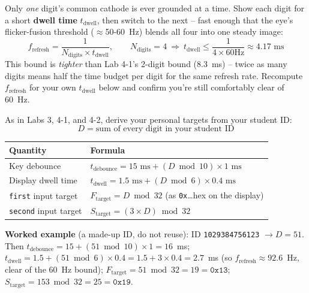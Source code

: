 \documentclass[11pt]{article}
\begin{document}
\begin{summary}
Only \emph{one} digit's common cathode is ever grounded at a time. Show each digit
for a short \textbf{dwell time} $t_{\text{dwell}}$, then switch to the next --
fast enough that the eye's flicker-fusion threshold ($\approx$50-60~Hz) blends all
four into one steady image:
\[
f_{\text{refresh}} = \frac{1}{N_{\text{digits}} \times t_{\text{dwell}}}, \qquad
N_{\text{digits}} = 4 \ \Rightarrow\ t_{\text{dwell}} \le \frac{1}{4 \times 60\text{Hz}}
\approx 4.17\text{ ms}
\]
This bound is \emph{tighter} than Lab 4-1's 2-digit bound (8.3~ms) -- twice as many
digits means half the time budget per digit for the same refresh rate. Recompute
$f_{\text{refresh}}$ for your own $t_{\text{dwell}}$ below and confirm you're still
comfortably clear of 60~Hz.
\end{summary}

\begin{summary}
As in Labs 3, 4-1, and 4-2, derive your personal targets from your student ID:
\[
D = \text{sum of every digit in your student ID}
\]
\begin{center}
\begin{tabular}{@{}p{4.6cm}p{10.0cm}@{}}
\toprule
\textbf{Quantity} & \textbf{Formula} \\
\midrule
Key debounce & $t_{\text{debounce}} = 15\text{ ms} + (D \bmod 10) \times 1\text{ ms}$ \\
Display dwell time & $t_{\text{dwell}} = 1.5\text{ ms} + (D \bmod 6) \times 0.4\text{ ms}$ \\
\texttt{first} input target & $F_{\text{target}} = D \bmod 32$ (as \texttt{0x}\ldots hex on the display) \\
\texttt{second} input target & $S_{\text{target}} = (3 \times D) \bmod 32$ \\
\bottomrule
\end{tabular}
\end{center}
\textbf{Worked example} (a made-up ID, do not reuse): ID \texttt{1029384756123}
$\to D = 51$. Then $t_{\text{debounce}} = 15 + (51 \bmod 10) \times 1 = 16$~ms;
$t_{\text{dwell}} = 1.5 + (51 \bmod 6) \times 0.4 = 1.5 + 3 \times 0.4 = 2.7$~ms
(so $f_{\text{refresh}} \approx 92.6$~Hz, clear of the 60~Hz bound);
$F_{\text{target}} = 51 \bmod 32 = 19 = \texttt{0x13}$; $S_{\text{target}} =
153 \bmod 32 = 25 = \texttt{0x19}$.
\end{summary}
\end{document}
